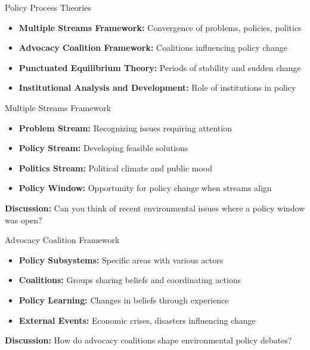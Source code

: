 \documentclass[11pt, aspectratio=169]{beamer}
\begin{document}
\begin{frame}{Policy Process Theories}
    \begin{itemize}
        \item \textbf{Multiple Streams Framework:} Convergence of problems, policies, politics
        \item \textbf{Advocacy Coalition Framework:} Coalitions influencing policy change
        \item \textbf{Punctuated Equilibrium Theory:} Periods of stability and sudden change
        \item \textbf{Institutional Analysis and Development:} Role of institutions in policy
    \end{itemize}
\end{frame}

\begin{frame}{Multiple Streams Framework}
    \begin{itemize}
        \item \textbf{Problem Stream:} Recognizing issues requiring attention
        \item \textbf{Policy Stream:} Developing feasible solutions
        \item \textbf{Politics Stream:} Political climate and public mood
        \item \textbf{Policy Window:} Opportunity for policy change when streams align
    \end{itemize}
    \pause
    \textbf{Discussion:} Can you think of recent environmental issues where a policy window was open?
\end{frame}

\begin{frame}{Advocacy Coalition Framework}
    \begin{itemize}
        \item \textbf{Policy Subsystems:} Specific areas with various actors
        \item \textbf{Coalitions:} Groups sharing beliefs and coordinating actions
        \item \textbf{Policy Learning:} Changes in beliefs through experience
        \item \textbf{External Events:} Economic crises, disasters influencing change
    \end{itemize}
    \pause
    \textbf{Discussion:} How do advocacy coalitions shape environmental policy debates?
\end{frame}
\end{document}
